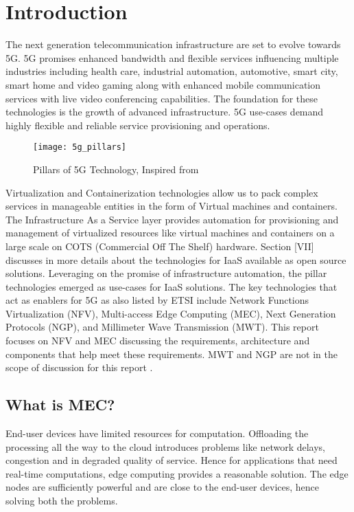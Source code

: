 \section{Introduction}
The next generation telecommunication infrastructure are set to evolve towards 5G. 5G promises enhanced bandwidth and flexible services influencing multiple industries including health care, industrial automation, automotive, smart city, smart home and video gaming along with enhanced mobile communication services with live video conferencing capabilities. The foundation for these technologies is the growth of advanced infrastructure. 5G use-cases demand highly flexible and reliable service provisioning and operations. 

\begin{figure}[H]
	\centering
	\texttt{[image: 5g\_pillars]}
	\label{fig:1}
    \caption{Pillars of 5G Technology, Inspired from \protect\cite{etsi5g}}
\end{figure}

Virtualization and Containerization technologies allow us to pack complex services in manageable entities in the form of Virtual machines and containers. The Infrastructure As a Service layer provides automation for provisioning and management of virtualized resources like virtual machines and containers on a large scale on COTS (Commercial Off The Shelf) hardware. Section [VII] discusses in more details about the technologies for IaaS available as open source solutions. Leveraging on the promise of infrastructure automation, the pillar technologies emerged as use-cases for IaaS solutions. The key technologies that act as enablers for 5G as also listed by ETSI include Network Functions Virtualization (NFV), Multi-access Edge Computing (MEC), Next Generation Protocols (NGP), and Millimeter Wave Transmission (MWT). This report focuses on NFV and MEC discussing the requirements, architecture and components that help meet these requirements. MWT and NGP are not in the scope of discussion for this report \cite*{taleb17}.

\subsection{What is MEC?}

End-user devices have limited resources for computation. Offloading the processing all the way to the cloud introduces problems like network delays, congestion and in degraded quality of service. Hence for applications that need real-time computations, edge computing provides a reasonable solution. The edge nodes are sufficiently powerful and are close to the end-user devices, hence solving both the problems.

